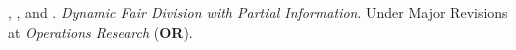\item {}, , and . \textit{Dynamic Fair Division with Partial Information}. Under Major Revisions at \textit{Operations Research} (\textbf{OR}).

